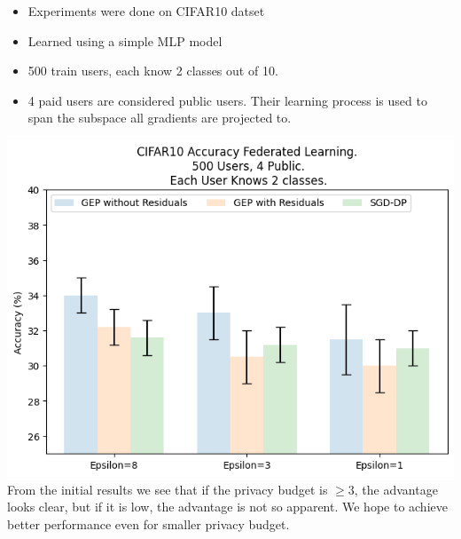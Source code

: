\documentclass[fourier]{_style/dissertation}
\begin{document}
 \begin{itemize}
           \item Experiments were done on CIFAR10 datset
           \item Learned using a simple MLP model
           \item 500 train users, each know 2 classes out of 10.
           \item 4 paid users are considered public users. Their learning process is used to span the subspace all gradients are projected to.
 \end{itemize}
  \includegraphics[height = 0.55\textwidth]{images/cifar10_dpsgd_vs_gep.png} \\
  From the initial results we see that if the privacy budget is $ \geq 3$, the advantage looks clear, but if it is low, the advantage is not so apparent. We hope to achieve better performance even for smaller privacy budget.

\printbibliography
\end{document}
